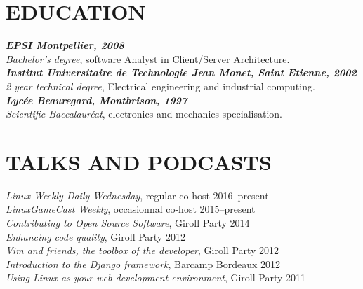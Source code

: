 \documentclass[line,resmargin]{res}
\begin{document}
\begin{resume}
\section{EDUCATION}
{\sl \textbf{EPSI Montpellier, 2008}\\
Bachelor's degree}, software Analyst in Client/Server Architecture.\\
{\sl \textbf{Institut Universitaire de Technologie Jean Monet, Saint Etienne, 2002}\\
2 year technical degree}, Electrical engineering and  industrial computing.\\
{\sl \textbf{Lyc\'{e}e Beauregard, Montbrison, 1997} \\
Scientific Baccalaur\'{e}at}, electronics and mechanics specialisation.

\section{TALKS AND PODCASTS}
    {\sl Linux Weekly Daily Wednesday}, regular co-host \hfill 2016--present \\
    {\sl LinuxGameCast Weekly}, occasionnal co-host \hfill 2015--present \\
    {\sl Contributing to Open Source Software}, Giroll Party \hfill 2014 \\
    {\sl Enhancing code quality}, Giroll Party \hfill 2012 \\
    {\sl Vim and friends, the toolbox of the developer}, Giroll Party \hfill 2012 \\
    {\sl Introduction to the Django framework}, Barcamp Bordeaux \hfill 2012 \\
    {\sl Using Linux as your web development environment}, Giroll Party \hfill 2011

\end{resume}
\end{document}
